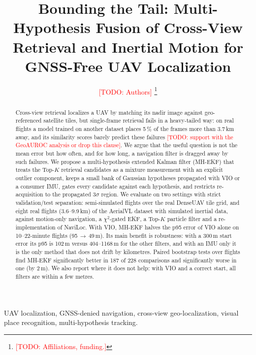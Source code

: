 \documentclass[journal]{IEEEtran}
\newcommand{\todo}[1]{\textcolor{red}{[TODO: #1]}}
\begin{document}
\title{Bounding the Tail: Multi-Hypothesis Fusion of Cross-View Retrieval and Inertial Motion for GNSS-Free UAV Localization}

\author{\todo{Authors}%
\thanks{\todo{Affiliations, funding.}}}

\maketitle

\begin{abstract}
Cross-view retrieval localizes a UAV by matching its nadir image against geo-referenced satellite tiles, but single-frame
retrieval fails in a heavy-tailed way: on real flights a model trained on another dataset places 5\,\% of the frames
more than 3.7\,km away, and its similarity scores barely predict these failures \todo{support with the GeoAUROC analysis or drop this clause}. We argue that the useful question is
not the mean error but how often, and for how long, a navigation filter is dragged away by such failures. We propose a
multi-hypothesis extended Kalman filter (MH-EKF) that treats the Top-$K$ retrieval candidates as a mixture measurement
with an explicit outlier component, keeps a small bank of Gaussian hypotheses propagated with VIO or a consumer IMU,
gates every candidate against each hypothesis, and restricts re-acquisition to the propagated $3\sigma$ region. We
evaluate on two settings with strict validation/test separation: semi-simulated flights over the real DenseUAV tile
grid, and eight real flights (3.6--9.9\,km) of the AerialVL dataset with simulated inertial data, against motion-only
navigation, a $\chi^2$-gated EKF, a Top-$K$ particle filter and a re-implementation of NaviLoc. With VIO, MH-EKF halves
the p95 error of VIO alone on 10--22-minute flights (95\,$\rightarrow$\,49\,m). Its main benefit is robustness: with a
300\,m start error its p95 is 102\,m versus 404--1168\,m for the other filters, and with an IMU only it is the only
method that does not drift by kilometres. Paired bootstrap tests over flights find MH-EKF significantly better in 187
of 228 comparisons and significantly worse in one (by 2\,m). We also report where it does not help: with VIO and a
correct start, all filters are within a few metres.
\end{abstract}

\begin{IEEEkeywords}
UAV localization, GNSS-denied navigation, cross-view geo-localization, visual place recognition, multi-hypothesis tracking.
\end{IEEEkeywords}
\end{document}
